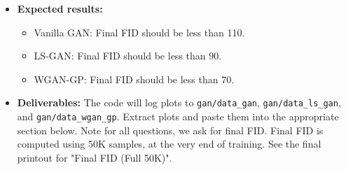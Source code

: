 \documentclass[11pt,addpoints,answers]{exam}
\numberwithin{equation}{section} %
\numberwithin{figure}{section} %
\numberwithin{table}{section} %
\begin{document}
\begin{itemize}
\begin{itemize}
\begin{minipage}[t]{\linewidth}
\begin{figure}[H]
          \end{figure}
          \end{minipage}
    \end{itemize}
\item \textbf{Expected results:}
    \begin{itemize}
        \item Vanilla GAN: Final FID should be less than 110.
        \item LS-GAN: Final FID should be less than 90.
        \item WGAN-GP: Final FID should be less than 70.
    \end{itemize}
\item \textbf{Deliverables:} The code will log plots to \texttt{gan/data\_gan}, \texttt{gan/data\_ls\_gan}, and \texttt{gan/data\_wgan\_gp}. Extract plots and paste them into the appropriate section below. Note for all questions, we ask for final FID. Final FID is computed using 50K samples, at the very end of training. See the final printout for "Final FID  (Full 50K)". 
\end{itemize}
\newpage
\end{document}
